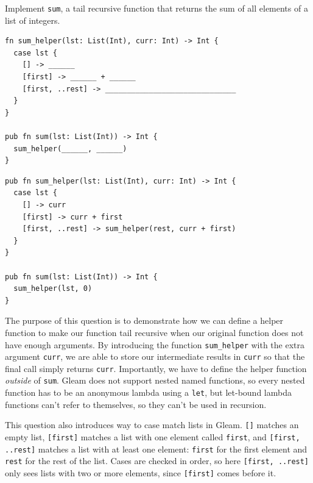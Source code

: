 \begin{blocksection}
\question Implement \texttt{sum}, a tail recursive function that returns the sum of
all elements of a list of integers.
\newline
\begin{lstlisting}
fn sum_helper(lst: List(Int), curr: Int) -> Int {
  case lst {
    [] -> ______
    [first] -> ______ + ______
    [first, ..rest] -> ______________________________
  }
}

pub fn sum(lst: List(Int)) -> Int {
  sum_helper(______, ______)
}
\end{lstlisting}
\begin{solution}
\begin{lstlisting}
pub fn sum_helper(lst: List(Int), curr: Int) -> Int {
  case lst {
    [] -> curr
    [first] -> curr + first
    [first, ..rest] -> sum_helper(rest, curr + first)
  }
}

pub fn sum(lst: List(Int)) -> Int {
  sum_helper(lst, 0)
}
\end{lstlisting}
\end{solution}

\begin{questionmeta}
  The purpose of this question is to demonstrate how we can define a helper function to make our function tail recursive when
  our original function does not have enough arguments. By introducing the function \lstinline{sum_helper} with the extra argument \lstinline{curr},
  we are able to store our intermediate results in \lstinline{curr} so that the final call simply returns \lstinline{curr}. Importantly, we have to
  define the helper function \textit{outside} of \lstinline{sum}. Gleam does not support nested named functions, so every nested function has to be
  an anonymous lambda using a \lstinline{let}, but let-bound lambda functions can't refer to themselves, so they can't be used in recursion.

  This question also introduces way to case match lists in Gleam. \lstinline{[]} matches an empty list, \lstinline{[first]} matches a list with one element
  called \lstinline{first}, and \lstinline{[first, ..rest]} matches a list with at least one element: \lstinline{first} for the first element and \lstinline{rest} for the rest
  of the list. Cases are checked in order, so here \lstinline{[first, ..rest]} only sees lists with two or more elements, since \lstinline{[first]} comes before it.
\end{questionmeta}
\end{blocksection}